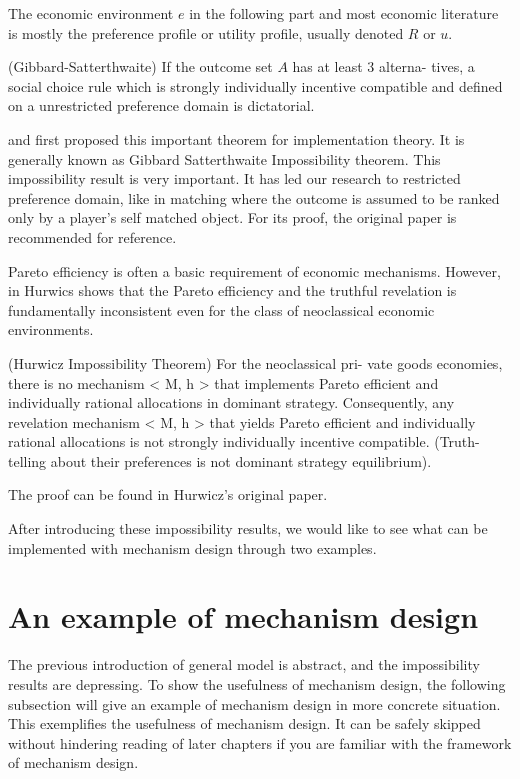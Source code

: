 The economic environment $e$ in the following part and most economic literature is mostly the preference profile or utility profile, usually denoted $R$ or $u$.

\begin{thm*}(Gibbard-Satterthwaite)
  \label{gibbard-satterthwaite}
If the outcome set $A$ has at least 3 alterna-
tives, a social choice rule which is strongly individually incentive compatible and
defined on a unrestricted preference domain is dictatorial.
\end{thm*}

\parencite{Gibbard1973} and \parencite{Satterthwaite1975} first proposed this important theorem for implementation theory. It is generally known as 
Gibbard Satterthwaite Impossibility theorem. This impossibility result is very important. It has led our research to restricted preference domain, like in matching where the outcome is assumed to be ranked only by a player's self matched object. For its proof, the original paper is recommended for reference.

Pareto efficiency is often a basic requirement of economic
mechanisms. However, in \parencite{Hurwicz1972}
Hurwics  shows that  the Pareto efficiency and the truthful revelation is
fundamentally inconsistent even for the class of neoclassical economic
environments.
\begin{thm*}
(Hurwicz Impossibility Theorem) For the neoclassical pri-
vate goods economies, there is no mechanism < M, h > that implements Pareto efficient
and individually rational allocations in dominant strategy. Consequently, any revelation
mechanism < M, h > that yields Pareto efficient and individually rational allocations is
not strongly individually incentive compatible. (Truth-telling about their preferences is not
dominant strategy equilibrium).
\end{thm*}
The proof can be found in Hurwicz's original paper. 

After introducing these impossibility results, we would like to see what can be implemented with mechanism design through two examples.

\section{An example of  mechanism design}

The previous introduction of general model is abstract, and the impossibility results are depressing. To show the usefulness of mechanism design, the following subsection will give an example of mechanism design in more concrete situation. This exemplifies the usefulness of mechanism design. It can be safely skipped without hindering reading of later chapters if you are familiar with the framework of mechanism design. 

